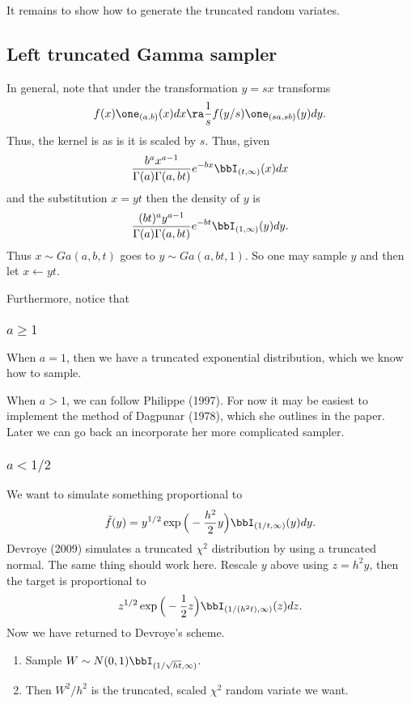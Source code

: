 \documentclass[12pt]{article}
\newcommand{\la}{\leftarrow}
\begin{document}
It remains to show how to generate the truncated random variates.

\subsection{Left truncated Gamma sampler}

In general, note that under the transformation $y = sx$ transforms
\[
f(x) \one_{(a,b)}(x) dx \ra \frac{1}{s} f(y/s) \one_{(sa,sb)}(y) dy.
\]
Thus, the kernel is as is it is scaled by $s$.  Thus, given
\[
\frac{b^a x^{a-1}}{\Gamma(a) \Gamma(a,bt)} e^{-bx} \bbI_{(t,\infty)}(x) dx
\]
and the substitution $x = yt$ then the density of $y$ is
\[
\frac{(bt)^a y^{a-1}}{\Gamma(a) \Gamma(a,bt)} e^{-bt} \bbI_{(1,\infty)}(y) dy.
\]
Thus $x \sim Ga(a,b,t)$ goes to $y \sim Ga(a,bt,1)$.  So one may sample $y$ and
then let $x \gets yt$.

Furthermore, notice that 

\subsubsection{$a \geq 1$}

When $a=1$, then we have a truncated exponential distribution, which we know how
to sample.

When $a > 1$, we can follow Philippe (1997).  For now it may be easiest to
implement the method of Dagpunar (1978), which she outlines in the paper.  Later
we can go back an incorporate her more complicated sampler.

\subsubsection{$a < 1/2$}

We want to simulate something proportional to
\[
\tilde f(y) = y^{1/2} \exp \Big( -\frac{h^2}{2} y \Big) \bbI_{(1/t,\infty)}(y) dy.
\]
Devroye (2009) simulates a truncated $\chi^2$ distribution by using a truncated
normal.  The same thing should work here.  Rescale $y$ above using $z = h^2y$,
then the target is proportional to
\[
z^{1/2} \exp \Big( -\frac{1}{2} z \Big) \bbI_{(1/(h^2 t), \infty)}(z) dz.
\]
Now we have returned to Devroye's scheme.  
\begin{enumerate}
\item Sample $W \sim N(0,1) \bbI_{(1/\sqrt{ht},\infty)}$.  

\item Then $W^2 / h^2$ is the truncated, scaled $\chi^2$ random variate we want.
\end{enumerate}
\end{document}
